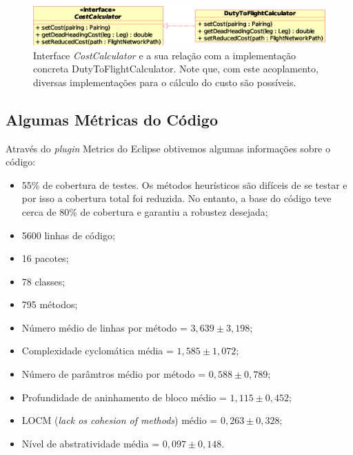 \begin{figure}[htbp]
	\begin{center}
		\includegraphics[scale=0.65]{fig/cost_calculator.eps}
		\caption{Interface {\it CostCalculator} e a sua relação com a implementação concreta
    DutyToFlightCalculator. Note que, com este acoplamento, diversas implementações para o cálculo
    do custo são possíveis.}
		\label{fig:cost_interface}
	\end{center}
\end{figure}



\subsection{Algumas Métricas do Código}
\label{sec:metricas}

Através do {\it plugin} Metrics do Eclipse obtivemos algumas informações sobre o código: 

\begin{itemize}
\item 55\% de cobertura de testes. Os métodos heurísticos são difíceis de se testar e por isso a
cobertura total foi reduzida. No entanto, a base do código teve cerca de 80\% de cobertura e 
garantiu a robustez desejada;
\item 5600 linhas de código; 
\item 16 pacotes; 
\item 78 classes; 
\item 795 métodos;
\item Número médio de linhas por método = $3,639 \pm 3,198$;
\item Complexidade cyclomática média = $1,585 \pm 1,072$;
\item Número de parâmtros médio por método = $0,588 \pm 0,789$;
\item Profundidade de aninhamento de bloco médio = $1,115 \pm 0,452$;
\item LOCM ({\it lack os cohesion of methods}) médio = $0,263 \pm 0,328$;
\item Nível de abstratividade média = $0,097 \pm 0,148$.
\end{itemize}

